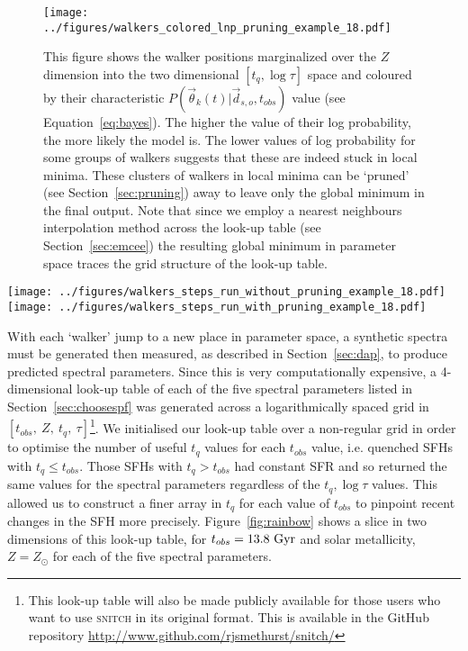 \documentclass[useAMS,usenatbib]{mn2e}
\begin{document}
\begin{figure}
\centering
\texttt{[image: ../figures/walkers\_colored\_lnp\_pruning\_example\_18.pdf]}
\caption{This figure shows the walker positions marginalized over the $Z$ dimension into the two dimensional $[t_q, \log\tau]$ space and coloured by their characteristic $P(\vec{\theta}_k (t)|\vec{d}_{s,o}, t_{obs})$ value (see Equation~\ref{eq:bayes}). The higher the value of their log probability, the more likely the model is. The lower values of log probability for some groups of walkers suggests that these are indeed stuck in local minima. These clusters of walkers in local minima can be `pruned' (see Section~\ref{sec:pruning}) away to leave only the global minimum in the final output. Note that since we employ a nearest neighbours interpolation method across the look-up table (see Section~\ref{sec:emcee}) the resulting global minimum in parameter space traces the grid structure of the look-up table.}
\label{fig:localminima}
\end{figure}


\begin{figure*}
\centering
\texttt{[image: ../figures/walkers\_steps\_run\_without\_pruning\_example\_18.pdf]}
\texttt{[image: ../figures/walkers\_steps\_run\_with\_pruning\_example\_18.pdf]}
\caption{The positions traced by the \emph{emcee} walkers with step number (i.e. time) in each of the $[Z, t_q, \log \tau]$ dimensions in the post burn-in phase before pruning (left) and after pruning (right). Walkers have got stuck in local minima (see also Figure~\ref{fig:localminima}) but some have managed to find the global minimum. The right panel therefore shows how the walkers left after pruning have fully explored the global minimum around the known true values (shown in red in each panel).}
\label{fig:comparepruning}
\end{figure*}

With each `walker' jump to a new place in parameter space, a synthetic spectra must be generated then measured, as described in Section~\ref{sec:dap}, to produce predicted spectral parameters. Since this is very computationally expensive, a 4-dimensional look-up table of each of the five spectral parameters listed in Section~\ref{sec:choosespf} was generated across a logarithmically spaced grid in $[t_{obs},~Z,~t_q,~\tau]$\footnote{This look-up table will also be made publicly available for those users who want to use \textsc{snitch} in its original format. This is available in the GitHub repository \url{http://www.github.com/rjsmethurst/snitch/}}. We initialised our look-up table over a non-regular grid in order to optimise the number of useful $t_q$ values for each $t_{obs}$ value, i.e. quenched SFHs with $t_q \leq t_{obs}$. Those SFHs with $t_q > t_{obs}$ had constant SFR and so returned the same values for the spectral parameters regardless of the $t_q, \log\tau$ values. This allowed us to construct a finer array in $t_q$ for each value of $t_{obs}$ to pinpoint recent changes in the SFH more precisely. Figure~\ref{fig:rainbow} shows a slice in two dimensions of this look-up table, for $t_{obs} = 13.8~\rm{Gyr}$ and solar metallicity, $Z=Z_{\odot}$ for each of the five spectral parameters.
\end{document}
